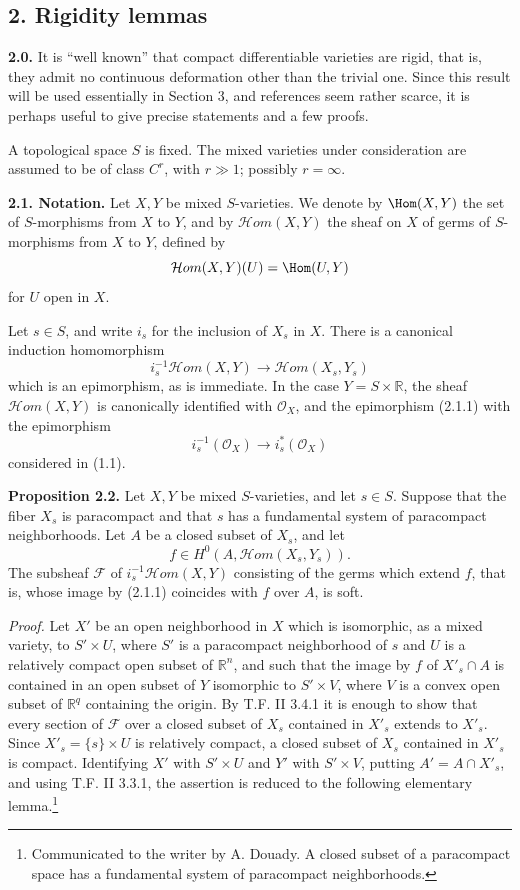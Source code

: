 \subsection*{2. Rigidity lemmas}

\textbf{2.0.} It is ``well known'' that compact differentiable varieties are rigid, that is, they admit no continuous deformation other than the trivial one. Since this result will be used essentially in Section 3, and references seem rather scarce, it is perhaps useful to give precise statements and a few proofs.

A topological space $S$ is fixed. The mixed varieties under consideration are assumed to be of class $C^r$, with $r\gg1$; possibly $r=\infty$.

\textbf{2.1. Notation.} Let $X,Y$ be mixed $S$-varieties. We denote by $\Hom(X,Y)$ the set of $S$-morphisms from $X$ to $Y$, and by $\mathcal Hom(X,Y)$ the sheaf on $X$ of germs of $S$-morphisms from $X$ to $Y$, defined by
\[
 \mathcal Hom(X,Y)(U)=\Hom(U,Y)
\]
for $U$ open in $X$.

Let $s\in S$, and write $i_s$ for the inclusion of $X_s$ in $X$. There is a canonical induction homomorphism
\begin{equation}\tag{2.1.1}
 i_s^{-1}\mathcal Hom(X,Y)\longrightarrow \mathcal Hom(X_s,Y_s)
\end{equation}
which is an epimorphism, as is immediate. In the case $Y=S\times\mathbb R$, the sheaf $\mathcal Hom(X,Y)$ is canonically identified with $\mathcal O_X$, and the epimorphism (2.1.1) with the epimorphism
\[
 i_s^{-1}(\mathcal O_X)\longrightarrow i_s^*(\mathcal O_X)
\]
considered in (1.1).

\textbf{Proposition 2.2.} Let $X,Y$ be mixed $S$-varieties, and let $s\in S$. Suppose that the fiber $X_s$ is paracompact and that $s$ has a fundamental system of paracompact neighborhoods. Let $A$ be a closed subset of $X_s$, and let
\[
 f\in H^0(A,\mathcal Hom(X_s,Y_s)).
\]
The subsheaf $\mathcal F$ of $i_s^{-1}\mathcal Hom(X,Y)$ consisting of the germs which extend $f$, that is, whose image by (2.1.1) coincides with $f$ over $A$, is soft.

\emph{Proof.} Let $X'$ be an open neighborhood in $X$ which is isomorphic, as a mixed variety, to $S'\times U$, where $S'$ is a paracompact neighborhood of $s$ and $U$ is a relatively compact open subset of $\mathbb R^n$, and such that the image by $f$ of $X'_s\cap A$ is contained in an open subset of $Y$ isomorphic to $S'\times V$, where $V$ is a convex open subset of $\mathbb R^q$ containing the origin. By T.F. II 3.4.1 it is enough to show that every section of $\mathcal F$ over a closed subset of $X_s$ contained in $X'_s$ extends to $X'_s$. Since $X'_s=\{s\}\times U$ is relatively compact, a closed subset of $X_s$ contained in $X'_s$ is compact. Identifying $X'$ with $S'\times U$ and $Y'$ with $S'\times V$, putting $A'=A\cap X'_s$, and using T.F. II 3.3.1, the assertion is reduced to the following elementary lemma.\footnote{Communicated to the writer by A. Douady. A closed subset of a paracompact space has a fundamental system of paracompact neighborhoods.}

